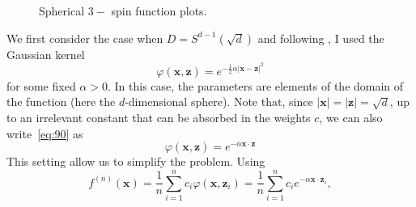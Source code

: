 \documentclass{article}
\theoremstyle{mystyle}
\begin{document}
 \begin{figure}[H]\centering
{}
\caption{Spherical $ 3-$ spin function plots.}
\label{fig: spherical 3-spin function plot}
\end{figure}

We first consider the case when $D = S^{d-1}(\sqrt{d})$ and following \cite{Rotskoff_2022}, I used the Gaussian kernel
%
\begin{equation}
  \label{eq:90}
  \varphi(\mathbf{x},\mathbf{z}) = e^{-\tfrac12 \alpha |\mathbf{x}-\mathbf{z}|^2}
\end{equation}
%
for some fixed $\alpha >0$. In this case, the parameters
are elements of the domain of the function (here the $d$-dimensional
sphere). 
Note that, since $|\mathbf{x}|=|\mathbf{z}| = \sqrt{d}$, up to an
irrelevant constant that can be absorbed in the weights $c$, we can
also write~\eqref{eq:90} as
%
\begin{equation}
  \label{eq:90red}
  \varphi(\mathbf{x},\mathbf{z}) = e^{-\alpha \mathbf{x}\cdot \mathbf{z}}
\end{equation}
%
This setting allow us to simplify the problem. Using
%
\begin{equation}
  \label{eq:119}
  f^{(n)}(\mathbf{x}) = \frac1n \sum_{i=1}^n c_i \varphi(\mathbf{x},\mathbf{z}_i)
  = \frac1n \sum_{i=1}^n c_i e^{-\alpha \mathbf{x}\cdot \mathbf{z}_i},
\end{equation}
\end{document}
